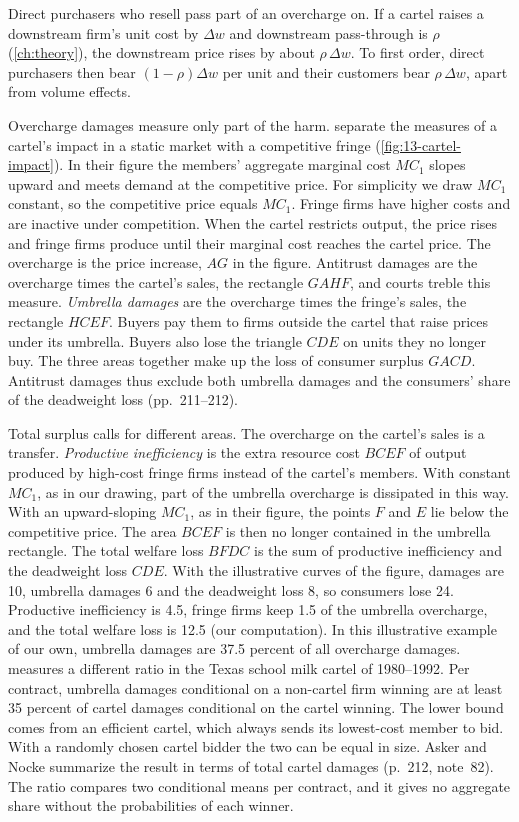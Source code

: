Direct purchasers who resell pass part of an overcharge on. If a cartel raises a downstream firm's unit cost by
$\Delta w$ and downstream pass-through is $\rho$ (\cref{ch:theory}), the downstream price rises by about
$\rho\,\Delta w$. To first order, direct purchasers then bear $(1-\rho)\Delta w$ per unit and their customers bear
$\rho\,\Delta w$, apart from volume effects.

Overcharge damages measure only part of the harm. \citet[pp.~210--212]{AskerNocke2021} separate the measures of a
cartel's impact in a static market with a competitive fringe (\cref{fig:13-cartel-impact}). In their figure the
members' aggregate marginal cost $MC_1$ slopes upward and meets demand at the competitive price. For simplicity we
draw $MC_1$ constant, so the competitive price equals $MC_1$. Fringe firms have higher costs and are inactive under
competition. When the cartel restricts output, the price rises and fringe firms produce until their marginal cost
reaches the cartel price. The overcharge is the price increase, $AG$ in the figure. Antitrust
damages are the overcharge times the cartel's sales, the rectangle $GAHF$, and courts treble this measure.
\emph{Umbrella damages} are the overcharge times the fringe's sales, the rectangle $HCEF$. Buyers pay them to firms
outside the cartel that raise prices under its umbrella. Buyers also lose the triangle $CDE$ on units they no longer
buy. The three areas together make up the loss of consumer surplus $GACD$. Antitrust damages thus exclude both
umbrella damages and the consumers' share of the deadweight loss (pp.~211--212).

Total surplus calls for different areas. The overcharge on the cartel's sales is a transfer. \emph{Productive
inefficiency} is the extra resource cost $BCEF$ of output produced by high-cost fringe firms instead of the cartel's
members. With constant $MC_1$, as in our drawing, part of the umbrella overcharge is dissipated in this way. With
an upward-sloping $MC_1$, as in their figure, the points $F$ and $E$ lie below the competitive price. The area
$BCEF$ is then no longer contained in the umbrella rectangle. The total welfare loss $BFDC$ is the sum of productive
inefficiency and the deadweight loss $CDE$. With the illustrative curves of the figure, damages are 10, umbrella
damages 6 and the deadweight loss 8, so consumers lose 24. Productive inefficiency is 4.5, fringe firms keep 1.5 of
the umbrella overcharge, and the total welfare loss is 12.5 (our computation). In this illustrative example of our
own, umbrella damages are 37.5 percent of all overcharge damages. \citet{Caoui2020} measures a different ratio in the
Texas school milk cartel of 1980--1992. Per contract, umbrella damages conditional on a non-cartel firm winning are
at least 35 percent of cartel damages conditional on the cartel winning. The lower bound comes from an efficient
cartel, which always sends its lowest-cost member to bid. With a randomly chosen cartel bidder the two can be equal
in size. Asker and Nocke summarize the result in terms of total cartel damages
(p.~212, note~82). The ratio compares two conditional means per contract, and it gives no aggregate share without
the probabilities of each winner.

